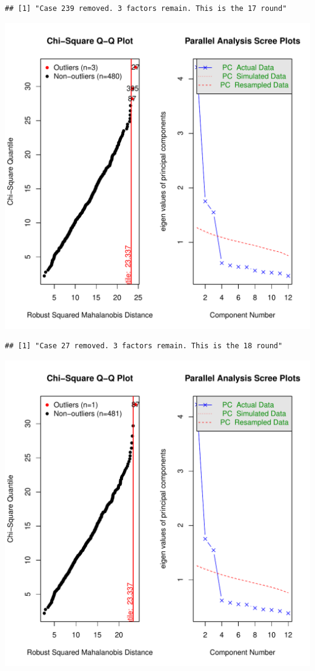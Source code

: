 \documentclass{article}\usepackage[]{graphicx}\usepackage[]{color}
\makeatletter
\def\maxwidth{ %
  \ifdim\Gin@nat@width>\linewidth
    \linewidth
  \else
    \Gin@nat@width
  \fi
}
\newenvironment{kframe}{%
 \def\at@end@of@kframe{}%
 \ifinner\ifhmode%
  \def\at@end@of@kframe{\end{minipage}}%
  \begin{minipage}{\columnwidth}%
 \fi\fi%
 \def\FrameCommand##1{\hskip\@totalleftmargin \hskip-\fboxsep
 \colorbox{shadecolor}{##1}\hskip-\fboxsep
     \hskip-\linewidth \hskip-\@totalleftmargin \hskip\columnwidth}%
 \MakeFramed {\advance\hsize-\width
   \@totalleftmargin\z@ \linewidth\hsize
   \@setminipage}}%
 {\par\unskip\endMakeFramed%
 \at@end@of@kframe}
\newenvironment{knitrout}{}{} %
\makeatother
\begin{document}
\begin{knitrout}
\begin{kframe}\begin{verbatim}
## [1] "Case 239 removed. 3 factors remain. This is the 17 round"
\end{verbatim}
\end{kframe}
\includegraphics[width=\maxwidth]{figure/unnamed-chunk-10-18} 
\begin{kframe}\begin{verbatim}
## [1] "Case 27 removed. 3 factors remain. This is the 18 round"
\end{verbatim}
\end{kframe}
\includegraphics[width=\maxwidth]{figure/unnamed-chunk-10-19} 

\end{knitrout}
\end{document}
